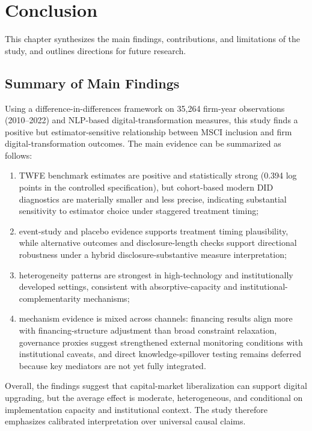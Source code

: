 \chapter{Conclusion}
\label{chap:conclusion}

This chapter synthesizes the main findings, contributions, and limitations of the study, and outlines directions for future research.

\section{Summary of Main Findings}

Using a difference-in-differences framework on 35,264 firm-year observations (2010--2022) and NLP-based digital-transformation measures, this study finds a positive but estimator-sensitive relationship between MSCI inclusion and firm digital-transformation outcomes. The main evidence can be summarized as follows:
\begin{enumerate}
\item TWFE benchmark estimates are positive and statistically strong (0.394 log points in the controlled specification), but cohort-based modern DID diagnostics are materially smaller and less precise, indicating substantial sensitivity to estimator choice under staggered treatment timing;
\item event-study and placebo evidence supports treatment timing plausibility, while alternative outcomes and disclosure-length checks support directional robustness under a hybrid disclosure-substantive measure interpretation;
\item heterogeneity patterns are strongest in high-technology and institutionally developed settings, consistent with absorptive-capacity and institutional-complementarity mechanisms;
\item mechanism evidence is mixed across channels: financing results align more with financing-structure adjustment than broad constraint relaxation, governance proxies suggest strengthened external monitoring conditions with institutional caveats, and direct knowledge-spillover testing remains deferred because key mediators are not yet fully integrated.
\end{enumerate}

Overall, the findings suggest that capital-market liberalization can support digital upgrading, but the average effect is moderate, heterogeneous, and conditional on implementation capacity and institutional context. The study therefore emphasizes calibrated interpretation over universal causal claims.


